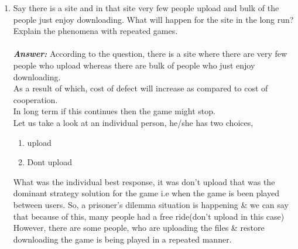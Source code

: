 \documentclass[12pt]{article}
\begin{document}
\begin{enumerate}
\begin{enumerate}
\item Say there is a site and in that site very few people upload and
bulk of the people just enjoy downloading. What will happen for
the site in the long run? Explain the phenomena with repeated
games.\\\\
\textbf{\emph{Answer: }}According to the question, there is a site where there are very few people who upload whereas there are bulk of people who just enjoy downloading.\\

As a result of which, cost of defect will increase as compared to cost of cooperation.\\
In long term if this continues then the game might stop.\\
Let us take a look at an individual person, he/she has two choices,\\
\begin{enumerate}
\item upload
\item Dont upload
\end{enumerate}

What was the individual best response, it was don't upload that was the dominant strategy solution for the game i.e when the game is been played between users.
So, a prisoner's dilemma situation is happening \& we can say that because of this, many people had a free ride(don't upload in this case)
However, there are some people, who are uploading the files \& restore downloading the game is being played in a repeated manner.


\end{enumerate}
\end{enumerate}
\end{document}
